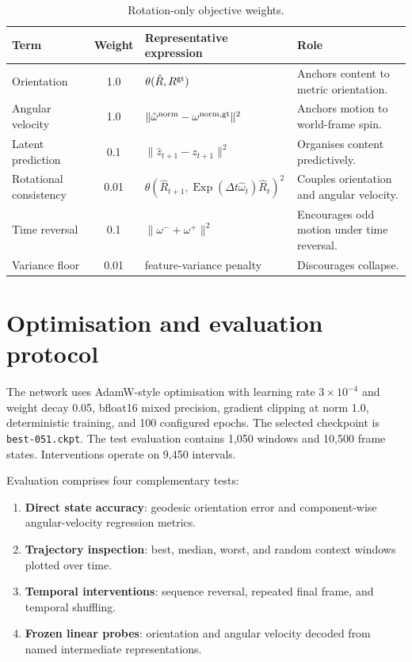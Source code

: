 \documentclass[11pt,a4paper]{article}
\newcommand{\Exp}{\operatorname{Exp}}
\begin{document}
\begin{table}[H]
\centering
\caption{Rotation-only objective weights.}
\begin{tabularx}{\textwidth}{lclX}
\toprule
Term & Weight & Representative expression & Role\\
\midrule
Orientation & 1.0 & $\theta(\hat R,R^{\rm gt})$ & Anchors content to metric orientation.\\
Angular velocity & 1.0 & $\|\hat\omega^{\rm norm}-\omega^{\rm norm,gt}\|^2$ & Anchors motion to world-frame spin.\\
Latent prediction & 0.1 & $\|\hat z_{t+1}-z_{t+1}\|^2$ & Organises content predictively.\\
Rotational consistency & 0.01 & $\theta(\hat R_{t+1},\Exp(\Delta t\hat\omega_t)\hat R_t)^2$ & Couples orientation and angular velocity.\\
Time reversal & 0.1 & $\|\omega^-+\omega^+\|^2$ & Encourages odd motion under time reversal.\\
Variance floor & 0.01 & feature-variance penalty & Discourages collapse.\\
\bottomrule
\end{tabularx}
\end{table}

\section{Optimisation and evaluation protocol}
The network uses AdamW-style optimisation with learning rate $3\times10^{-4}$ and weight decay 0.05, bfloat16 mixed precision, gradient clipping at norm 1.0, deterministic training, and 100 configured epochs. The selected checkpoint is \texttt{best-051.ckpt}. The test evaluation contains 1,050 windows and 10,500 frame states. Interventions operate on 9,450 intervals.

Evaluation comprises four complementary tests:
\begin{enumerate}[leftmargin=*]
\item \textbf{Direct state accuracy}: geodesic orientation error and component-wise angular-velocity regression metrics.
\item \textbf{Trajectory inspection}: best, median, worst, and random context windows plotted over time.
\item \textbf{Temporal interventions}: sequence reversal, repeated final frame, and temporal shuffling.
\item \textbf{Frozen linear probes}: orientation and angular velocity decoded from named intermediate representations.
\end{enumerate}
\end{document}
